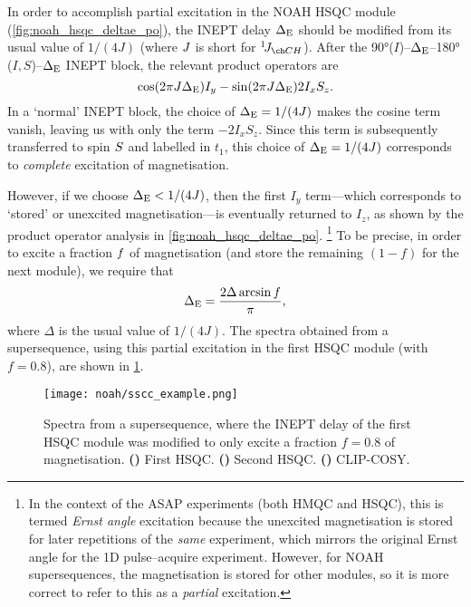 In order to accomplish partial  excitation in the NOAH HSQC module (\cref{fig:noah_hsqc_deltae_po}), the INEPT delay $\Delta_{\text{E}}$ should be modified from its usual value of $1 / (4J)$ (where $J\/$ is short for $\oneJ{CH}$).
After the \ang{90}($I$)--$\Delta_{\text{E}}$--\ang{180}($I,S$)--$\Delta_{\text{E}}$ INEPT block, the relevant product operators are
\begin{equation}
    \label{eq:inept_changed}
    \cos(2\pi J\Delta_{\text{E}}) I_y - \sin(2\pi J\Delta_{\text{E}}) 2I_xS_z.
\end{equation}
In a `normal' INEPT block, the choice of $\Delta_{\text{E}} = 1/(4J)$ makes the cosine term vanish, leaving us with only the term $-2I_xS_z$.
Since this term is subsequently transferred to spin $S\/$ and labelled in $t_1$, this choice of $\Delta_{\text{E}} = 1/(4J)$ corresponds to \textit{complete} excitation of  magnetisation.

However, if we choose $\Delta_{\text{E}} < 1/(4J)$, then the first $I_y$ term---which corresponds to `stored' or unexcited  magnetisation---is eventually returned to $I_z$, as shown by the product operator analysis in \cref{fig:noah_hsqc_deltae_po}.%
\footnote{In the context of the ASAP experiments (both HMQC and HSQC), this is termed \textit{Ernst angle} excitation because the unexcited magnetisation is stored for later repetitions of the \textit{same} experiment, which mirrors the original Ernst angle for the 1D pulse--acquire experiment.
However, for NOAH supersequences, the magnetisation is stored for other modules, so it is more correct to refer to this as a \textit{partial} excitation.}
To be precise, in order to excite a fraction $f\/$ of  magnetisation (and store the remaining $(1 - f)$ for the next module), we require that
\begin{equation}
    \label{eq:ssc_inept_delay}
    \Delta_{\text{E}} = \frac{2\Delta \arcsin f}{\pi},
\end{equation}
where $\Delta$ is the usual value of $1/(4J)$.
The spectra obtained from a  supersequence, using this partial  excitation in the first HSQC module (with $f = 0.8$), are shown in \cref{fig:sscc_example}.

\begin{figure}[!ht]
    \centering
    \texttt{[image: noah/sscc\_example.png]}%
    {\label{fig:sscc_example_s1}}%
    {\label{fig:sscc_example_s2}}%
    {\label{fig:sscc_example_cc}}%
    \caption[Spectra from  supersequence]{
        Spectra from a  supersequence, where the INEPT delay of the first HSQC module was modified to only excite a fraction $f = 0.8$ of  magnetisation.
        \textbf{()} First HSQC.
        \textbf{()} Second HSQC.
        \textbf{()} CLIP-COSY.
    }
    \label{fig:sscc_example}
\end{figure}

